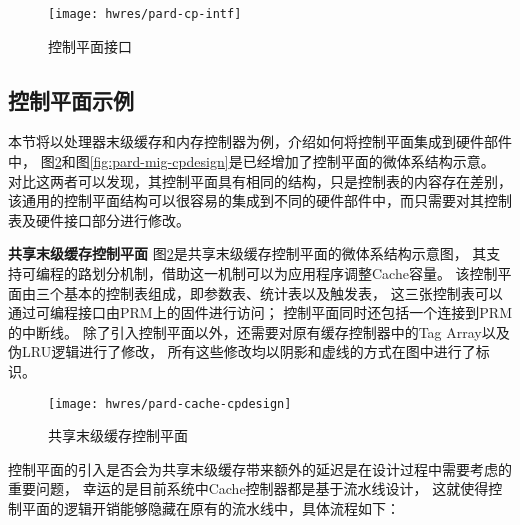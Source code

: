 \begin{figure}[tb]
  \centering
  \texttt{[image: hwres/pard-cp-intf]}
  \caption[控制平面接口]{控制平面接口}
  \label{fig:pard-cp-intf}
\end{figure}


\subsection{控制平面示例}

本节将以处理器末级缓存和内存控制器为例，介绍如何将控制平面集成到硬件部件中，
图\ref{fig:pard-cache-cpdesign}和图\ref{fig:pard-mig-cpdesign}是已经增加了控制平面的微体系结构示意。
对比这两者可以发现，其控制平面具有相同的结构，只是控制表的内容存在差别，
该通用的控制平面结构可以很容易的集成到不同的硬件部件中，而只需要对其控制表及硬件接口部分进行修改。

\textbf{共享末级缓存控制平面}\quad
图\ref{fig:pard-cache-cpdesign}是共享末级缓存控制平面的微体系结构示意图，
其支持可编程的路划分机制，借助这一机制可以为应用程序调整Cache容量。
该控制平面由三个基本的控制表组成，即参数表、统计表以及触发表，
这三张控制表可以通过可编程接口由PRM上的固件进行访问；
控制平面同时还包括一个连接到PRM的中断线。
除了引入控制平面以外，还需要对原有缓存控制器中的Tag Array以及伪LRU逻辑进行了修改，
所有这些修改均以阴影和虚线的方式在图中进行了标识。

\begin{figure}[tb]
  \centering
  \texttt{[image: hwres/pard-cache-cpdesign]}
  \caption{共享末级缓存控制平面}
  \label{fig:pard-cache-cpdesign}
\end{figure}

控制平面的引入是否会为共享末级缓存带来额外的延迟是在设计过程中需要考虑的重要问题，
幸运的是目前系统中Cache控制器都是基于流水线设计，
这就使得控制平面的逻辑开销能够隐藏在原有的流水线中，具体流程如下：

